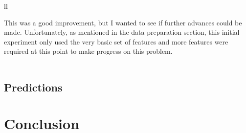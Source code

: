 \documentclass[paper=a4, fontsize=11pt]{scrartcl} %
\numberwithin{equation}{section} %
\numberwithin{figure}{section} %
\numberwithin{table}{section} %
\begin{document}
\begin{table}[thb]
\centering
\caption{\label{cost_sensitive_confusion}Confusion Matrix}
\begin{tabular}{ll}
\end{tabular}
\end{table}

This was a good improvement, but I wanted to see if further advances could be made. Unfortunately, as mentioned in the data preparation section, this initial experiment only used the very basic set of features and more features were required at this point to make progress on this problem.\\
\\

\subsection{Predictions}

\section{Conclusion}
\end{document}
